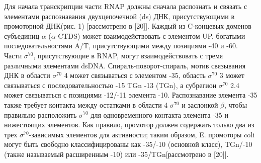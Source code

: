 \documentclass[a4paper,12pt]{article}
\begin{document}
    \par{Для начала транскрипции части RNAP должны сначала распознать и связать с элементами распознавания двухцепочечной
    (ds) ДНК, присутствующими в промоторной ДНК(рис. 1) [рассмотрено в [20]]. Каждый из C-концевых доменов субъединиц
    \(\alpha\) (\(\alpha\)-CTDS) может взаимодействовать с элементом UP, богатыми последовательностями A/T,
    присутствующими между позициями -40 и -60. Части \(\sigma^{70}\), присутствующие в RNAP, могут взаимодействовать с
    тремя различными элементами dsDNA. Спираль-поворот-спираль, мотив связывания ДНК в области \(\sigma^{70}\) 4 может
    связываться с элементом -35, область \(\sigma^{70}\) 3 может связываться с последовательностью -15 TGn -13 (TGn), а
    субрегион \(\sigma^{70}\) 2.4 может связываться с позициями -12/-11 элемента -10. Распознавание элемента -35 также
    требует контакта между остатками в области 4 \(\sigma^{70}\) и заслонкой \(\beta\), чтобы правильно расположить
    \(\sigma^{70}\) для одновременного контакта элемента -35 и нижестоящих элементов. Как правило, промотор должен
    содержать только два из трех \(\sigma^{70}\)-зависимых элементов для активности; таким образом, E. промоторы coli
    могут быть свободно классифицированы как -35/-10 (основной класс), TGn/-10 (также называемый расширенным -10) или
    -35/TGn[рассмотрено в [20]].}
\end{document}
